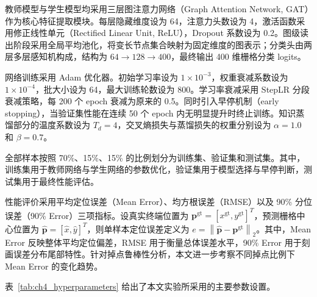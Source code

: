 教师模型与学生模型均采用三层图注意力网络（Graph Attention Network, GAT）作为核心特征提取模块。每层隐藏维度设为 64，注意力头数设为 4，激活函数采用修正线性单元（Rectified Linear Unit, ReLU），Dropout 系数设为 0.2。图级读出阶段采用全局平均池化，将变长节点集合映射为固定维度的图表示；分类头由两层多层感知机构成，结构为 \(64 \rightarrow 128 \rightarrow 400\)，最终输出 400 维栅格分类 logits。

网络训练采用 Adam 优化器。初始学习率设为 \(1\times10^{-3}\)，权重衰减系数设为 \(1\times10^{-4}\)，批大小设为 64，最大训练轮数设为 800。学习率衰减采用 StepLR 分段衰减策略，每 200 个 epoch 衰减为原来的 0.5。同时引入早停机制（early stopping），当验证集性能在连续 50 个 epoch 内无明显提升时终止训练。知识蒸馏部分的温度系数设为 \(T_d=4\)，交叉熵损失与蒸馏损失的权重分别设为 \(\alpha=1.0\) 和 \(\beta=0.7\)。

全部样本按照 70\%、15\%、15\% 的比例划分为训练集、验证集和测试集。其中，训练集用于教师网络与学生网络的参数优化，验证集用于模型选择与早停判断，测试集用于最终性能评估。

性能评价采用平均定位误差（Mean Error）、均方根误差（RMSE）以及 90\% 分位误差（90\% Error）三项指标。设真实终端位置为 \(\mathbf{p}^{\mathrm{gt}}=[x^{\mathrm{gt}},y^{\mathrm{gt}}]^T\)，预测栅格中心位置为 \(\hat{\mathbf{p}}=[\hat{x},\hat{y}]^T\)，则单样本定位误差定义为 \(e=\left\|\hat{\mathbf{p}}-\mathbf{p}^{\mathrm{gt}}\right\|_2\)。其中，Mean Error 反映整体平均定位偏差，RMSE 用于衡量总体误差水平，90\% Error 用于刻画误差分布尾部特性。针对掉点鲁棒性分析，本文进一步考察不同掉点比例下 Mean Error 的变化趋势。

表~\ref{tab:ch4_hyperparameters} 给出了本文实验所采用的主要参数设置。

